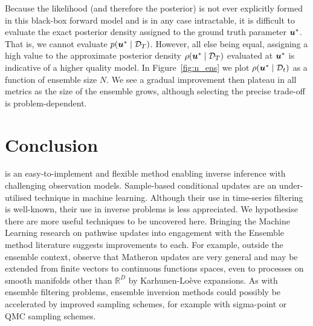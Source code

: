 \documentclass{article}
\theoremstyle{plain}
\theoremstyle{definition}
\theoremstyle{remark}
\begin{document}
Because the likelihood (and therefore the posterior) is not ever explicitly formed in this black-box forward model and is in any case intractable, it is difficult to evaluate the exact posterior density assigned to the ground truth parameter $\boldsymbol{u}^\ast$.
That is, we cannot evaluate $p(\boldsymbol{u}^\ast \mid \mathcal{D}_T)$.
However, all else being equal, assigning a high value to the approximate posterior density $\rho(\boldsymbol{u}^\ast \mid \mathcal{D}_T)$ evaluated at $\boldsymbol{u}^\ast$ is indicative of a higher quality model.
In Figure~\ref{fig:n_ens} we plot $\rho(\boldsymbol{u}^\ast \mid \mathcal{D}_t)$ as a function of ensemble size $N$.
We see a gradual improvement then plateau in all metrics as the size of the ensemble grows, although selecting the precise trade-off is problem-dependent.




\section{Conclusion}

\meth{} is an easy-to-implement and flexible method enabling inverse inference with challenging observation models.
Sample-based conditional updates are an under-utilised technique in machine learning.
Although their use in time-series filtering is well-known, their use in inverse problems is less appreciated.
We hypothesise there are more useful techniques to be uncovered here.
Bringing the Machine Learning research on pathwise updates into engagement with the Ensemble method literature suggests improvements to each.
For example, outside the ensemble context, \citet{WilsonPathwise2021} observe that Matheron updates are very general and may be extended from finite vectors to continuous functions spaces, even to processes on smooth manifolds other than \(\mathbb{R}^{D}\) by Karhunen-Lo\`eve expansions.
As with ensemble  filtering problems, ensemble inversion methods could possibly be accelerated by improved sampling schemes, for example with sigma-point or QMC sampling schemes.


\clearpage


\end{document}
